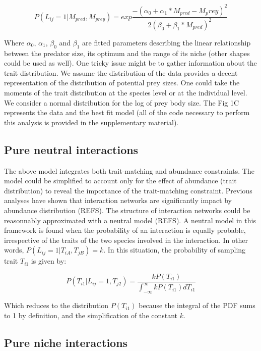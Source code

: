 \documentclass[11pt]{article}
\begin{document}
\begin{equation}  
	P(L_{ij}=1|M_{pred},M_{prey})= exp\frac{-(\alpha_0+\alpha_1*M_{pred}-M_prey)^2}{2(\beta_0+\beta_1*M_{pred})^2}
\end{equation}

Where $\alpha_0$, $\alpha_1$, $\beta_0$ and $\beta_1$ are fitted parameters describing the linear relationship between the predator size, its optimum and the range of its niche (other shapes could be used as well). One tricky issue might be to gather information about the trait distribution. We assume the distribution of the data provides a decent representation of the distribution of potential prey sizes. One could take the moments of the trait distribution at the species level or at the individual level. We consider a normal distribution for the log of prey body size. The Fig 1C represents the data and the best fit model (all of the code necessary to perform this analysis is provided in the supplementary material). 

\subsection*{Pure neutral interactions}

The above model integrates both trait-matching and abundance constraints. The model could be simplified to account only for the effect of abundance (trait distribution) to reveal the importance of the trait-matching constraint. Previous analyses have shown that interaction networks are significantly impact by abundance distribution (REFS). The structure of interaction networks could be reasonnably approximated with a neutral model (REFS). A neutral model in this framework is found when the probability of an interaction is equally probable, irrespective of the traits of the two species involved in the interaction. In other words, $P(L_{ij}=1|T_{iA},T_{jB})=k$. In this situation, the probability of sampling trait $T_{i1}$ is given by: 

\begin{equation}  
	P(T_{i1}|L_{ij}=1,T_{j2})=\frac{kP(T_{i1})}{\int_{-\infty}^{\infty}kP(T_{i1})dT_{i1}}
\end{equation}

Which reduces to the distribution $P(T_{i1})$ because the integral of the PDF sums to 1 by definition, and the simplification of the constant $k$. 

\subsection*{Pure niche interactions}
\end{document}
